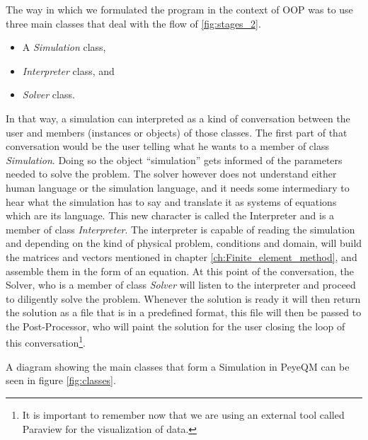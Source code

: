 The way in which we formulated the program in the context of OOP was to use three main classes that deal with the flow of  \ref{fig:stages_2}.
\begin{itemize}
\item A \textit{Simulation} class,
\item \textit{Interpreter} class, and
\item \textit{Solver} class.
\end{itemize}
In that way, a simulation can interpreted as a kind of conversation between the user and members (instances or objects) of those classes. The first part of that conversation would be the user telling what he wants to a member of class \textit{Simulation}. Doing so the object ``simulation'' gets informed of the parameters needed to solve the problem.  The solver however does not understand either human language or the simulation language, and it needs some intermediary to hear what the simulation has to say and translate it as systems of equations which are its language. This new character is called the Interpreter and is a member of class \textit{Interpreter}. The interpreter is capable of reading the simulation and depending on the kind of physical problem, conditions and domain, will build the matrices and vectors mentioned in chapter \ref{ch:Finite_element_method}, and assemble them in the form of an equation. At this point of the conversation, the Solver, who is a member of class \textit{Solver} will listen to the interpreter and proceed to diligently solve the problem. Whenever the solution is ready it will then return the solution as a file that is in a predefined format, this file will then be passed to the Post-Processor, who will paint the solution for the user closing the loop of this conversation\footnote{It is important to remember now that we are using an external tool called Paraview for the visualization of data.}. 

A diagram showing the main classes that form a Simulation in PeyeQM can be seen in figure \ref{fig:classes}.

